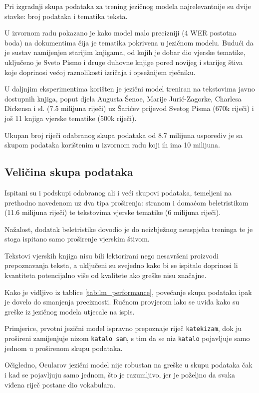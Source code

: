 \documentclass[zavrsnirad]{fer}
\begin{document}
Pri izgradnji skupa podataka za trening jezičnog modela najrelevantnije su dvije stavke: broj podataka i tematika teksta.

U izvornom radu pokazano je kako model malo precizniji (4 WER postotna boda) na dokumentima čija je tematika pokrivena u jezičnom modelu. Budući da je sustav namijenjen starijim knjigama, od kojih je dobar dio vjerske tematike, uključeno je Sveto Pismo i druge duhovne knjige pored novijeg i starijeg štiva koje doprinosi većoj raznolikosti izričaja i opsežnijem rječniku.
\cite{Berg2013}

U daljnjim eksperimentima korišten je jezični model treniran na tekstovima javno dostupnih knjiga, poput djela Augusta Šenoe, Marije Jurić-Zagorke, Charlesa Dickensa i sl. (7.5 milijuna riječi) uz Šarićev prijevod Svetog Pisma (670k riječi) i još 11 knjiga vjerske tematike (500k riječi). 

Ukupan broj riječi odabranog skupa podataka od 8.7 milijuna usporediv je sa skupom podataka korištenim u izvornom radu koji ih ima 10 milijuna.

\subsection{Veličina skupa podataka}

Ispitani su i podskupi odabranog ali i veći skupovi podataka, temeljeni na prethodno navedenom uz dva tipa proširenja: stranom i domaćom beletristikom (11.6 milijuna riječi) te tekstovima vjerske tematike (6 milijuna riječi). 

Nažalost, dodatak beletristike dovodio je do neizbježnog neuspjeha treninga te je stoga ispitano samo proširenje vjerskim štivom.

Tekstovi vjerskih knjiga nisu bili lektorirani nego nesavršeni proizvodi prepoznavanja teksta, a uključeni su svejedno kako bi se ispitalo doprinosi li kvantiteta potencijalno više od kvalitete ako greške nisu značajne.

Kako je vidljivo iz tablice \ref{tab:lm_performance}, povećanje skupa podataka ipak je dovelo do smanjenja preciznosti. Ručnom provjerom lako se uviđa kako su greške iz jezičnog modela utjecale na ispis.

Primjerice, prvotni jezični model ispravno prepoznaje riječ \texttt{katekizam}, dok ju prošireni zamijenjuje nizom \texttt{katalo sam}, s tim da se niz \texttt{katalo} pojavljuje samo jednom u proširenom skupu podataka.

Očigledno, Ocularov jezični model nije robustan na greške u skupu podataka čak i kad se pojavljuju samo jednom, što je razumljivo, jer je poželjno da svaka viđena riječ postane dio vokabulara.
\end{document}
